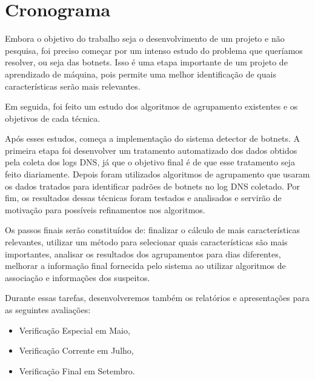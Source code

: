 \chapter{Cronograma}
Embora o objetivo do trabalho seja o desenvolvimento de um projeto e não pesquisa, foi preciso começar por um intenso estudo do problema que queríamos resolver, ou seja das botnets. Isso é uma etapa importante de um projeto de aprendizado de máquina, pois permite uma melhor identificação de quais características serão mais relevantes.

Em seguida, foi feito um estudo dos algoritmos de agrupamento existentes e os objetivos de cada técnica.

Após esses estudos, começa a implementação do sistema detector de botnets. A primeira etapa foi desenvolver um tratamento automatizado dos dados obtidos pela coleta dos logs DNS, já que o objetivo final é de que esse tratamento seja feito diariamente. Depois foram utilizados algoritmos de agrupamento que usaram os dados tratados para identificar padrões de botnets no log DNS coletado. Por fim, os resultados dessas técnicas foram testados e analisados e servirão de motivação para possíveis refinamentos nos algoritmos.

Os passos finais serão constituídos de: finalizar o cálculo de mais características relevantes, utilizar um método para selecionar quais características são mais importantes, analisar os resultados dos agrupamentos para dias diferentes, melhorar a informação final fornecida pelo sistema ao utilizar algoritmos de associação e informações dos suspeitos.

Durante essas tarefas, desenvolveremos também os relatórios e apresentações para as seguintes avaliações:

\begin{itemize}  
\item Verificação Especial em Maio,
\item Verificação Corrente em Julho,
\item Verificação Final em Setembro.
\end{itemize}

